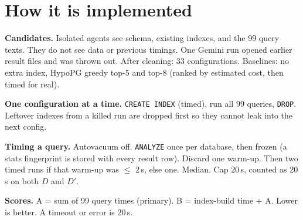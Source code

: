 \documentclass[11pt,a4paper]{article}
\begin{document}
\section{How it is implemented}

\begin{center}
\end{center}

\textbf{Candidates.} Isolated agents see schema, existing indexes, and the 99 query texts. They do not see data or previous timings. One Gemini run opened earlier result files and was thrown out. After cleaning: 33 configurations. Baselines: no extra index, HypoPG greedy top-5 and top-8 (ranked by estimated cost, then timed for real).

\textbf{One configuration at a time.} \texttt{CREATE INDEX} (timed), run all 99 queries, \texttt{DROP}. Leftover indexes from a killed run are dropped first so they cannot leak into the next config.

\textbf{Timing a query.} Autovacuum off. \texttt{ANALYZE} once per database, then frozen (a stats fingerprint is stored with every result row). Discard one warm-up. Then two timed runs if that warm-up was $\le$ 2\,s, else one. Median. Cap 20\,s, counted as 20\,s on both $D$ and $D'$.

\textbf{Scores.} A = sum of 99 query times (primary). B = index-build time + A. Lower is better. A timeout or error is 20\,s.
\end{document}
